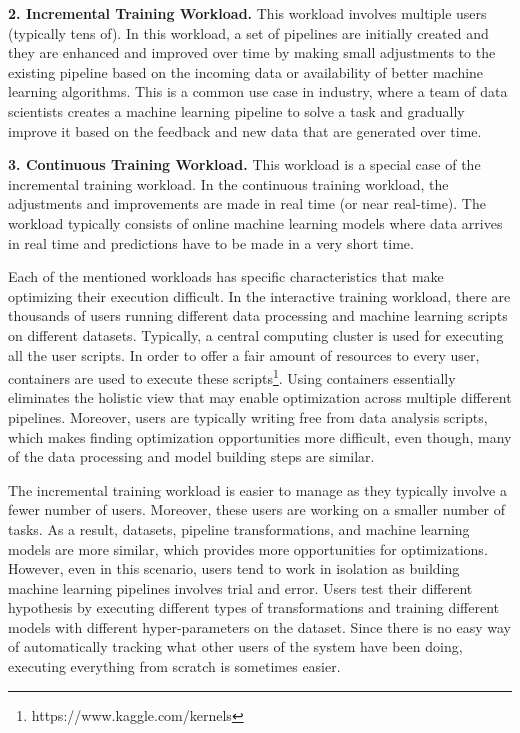 \documentclass{sig-alternate-05-2015}
\begin{document}
\textbf{2. Incremental Training Workload. }
This workload involves multiple users (typically tens of). 
In this workload, a set of pipelines are initially created and they are enhanced and improved over time by making small adjustments to the existing pipeline based on the incoming data or availability of better machine learning algorithms.
This is a common use case in industry, where a team of data scientists creates a machine learning pipeline to solve a task and gradually improve it based on the feedback and new data that are generated over time.

\textbf{3. Continuous Training Workload. }
This workload is a special case of the incremental training workload.
In the continuous training workload, the adjustments and improvements are made in real time (or near real-time).
The workload typically consists of online machine learning models where data arrives in real time and predictions have to be made in a very short time.

Each of the mentioned workloads has specific characteristics that make optimizing their execution difficult.
In the interactive training workload, there are thousands of users running different data processing and machine learning scripts on different datasets. 
Typically, a central computing cluster is used for executing all the user scripts. In order to offer a fair amount of resources to every user, containers are used to execute these scripts\footnote{https://www.kaggle.com/kernels}.
Using containers essentially eliminates the holistic view that may enable optimization across multiple different pipelines.
Moreover, users are typically writing free from data analysis scripts, which makes finding optimization opportunities more difficult, even though, many of the data processing and model building steps are similar.

The incremental training workload is easier to manage as they typically involve a fewer number of users.
Moreover, these users are working on a smaller number of tasks.
As a result, datasets, pipeline transformations, and machine learning models are more similar, which provides more opportunities for optimizations.
However, even in this scenario, users tend to work in isolation as building machine learning pipelines involves trial and error.
Users test their different hypothesis by executing different types of transformations and training different models with different hyper-parameters on the dataset.
Since there is no easy way of automatically tracking what other users of the system have been doing, executing everything from scratch is sometimes easier.
\end{document}
